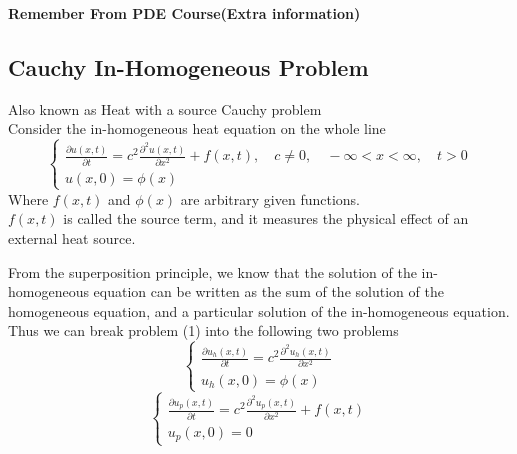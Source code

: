 \documentclass[]{article}
\begin{document}
\setcounter{equation}{0}
\begin{enrichment*}{}
        \begin{center}
                \textbf{Remember From PDE Course(Extra information)}
        \end{center}
    \end{enrichment*}


\subsection{Cauchy In-Homogeneous Problem}
Also known as Heat with a source Cauchy problem
\\
Consider the in-homogeneous heat equation on the whole line
\begin{equation}
    \begin{cases}
        \displaystyle \frac{\partial u\left(x,t \right)}{\partial t} = c^2 \frac{\partial^2 u(x,t)}{\partial x^2} + f(x,t),\quad c\neq 0,\quad-\infty<x<\infty,\quad t>0
        \\
        u\left(x,0 \right) = \phi\left(x\right)
    \end{cases}
\end{equation}
Where $f(x, t)$ and $\phi(x)$ are arbitrary given functions. 
\\$f(x, t)$ is called the source term, and it measures the physical effect of an external heat source.
\par
From the superposition principle, we know that the solution of the in-homogeneous equation can
be written as the sum of the solution of the homogeneous equation, and a particular solution of the
in-homogeneous equation. 
\\
Thus we can break problem (1) into the following two problems
\begin{equation}
    \begin{cases}
        \displaystyle \frac{\partial u_h\left(x,t \right)}{\partial t} = c^2 \frac{\partial^2 u_h(x,t)}{\partial x^2}
        \\
        u_h\left(x,0 \right) = \phi\left(x\right)
    \end{cases}
\end{equation}
\begin{equation}
    \begin{cases}
        \displaystyle \frac{\partial u_p\left(x,t \right)}{\partial t} = c^2 \frac{\partial^2 u_p(x,t)}{\partial x^2}+ f(x,t)
        \\
        u_p\left(x,0 \right) = 0
    \end{cases}
\end{equation}
\end{document}
